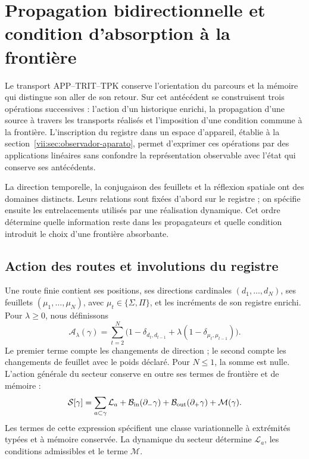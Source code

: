 
\section{Propagation bidirectionnelle et condition d'absorption à la frontière}
\label{vii:sec:propagacion-bidireccional}

Le transport APP--TRIT--TPK conserve l'orientation du parcours et la mémoire qui distingue son aller de son retour. Sur cet antécédent se construisent trois opérations successives : l'action d'un historique enrichi, la propagation d'une source à travers les transports réalisés et l'imposition d'une condition commune à la frontière. L'inscription du registre dans un espace d'appareil, établie à la section~\ref{vii:sec:observador-aparato}, permet d'exprimer ces opérations par des applications linéaires sans confondre la représentation observable avec l'état qui conserve ses antécédents.

La direction temporelle, la conjugaison des feuillets et la réflexion spatiale
ont des domaines distincts. Leurs relations sont fixées d'abord sur le registre ;
on spécifie ensuite les entrelacements utilisés par une réalisation
dynamique. Cet ordre détermine quelle information reste dans les propagateurs
et quelle condition introduit le choix d'une frontière absorbante.

\subsection{Action des routes et involutions du registre}
\label{vii:subsec:accion-bidireccional}

Une route finie contient ses positions, ses directions cardinales
\((d_1,\ldots,d_N)\), ses feuillets \((\mu_1,\ldots,\mu_N)\), avec
\(\mu_t\in\{\Sigma,\Pi\}\), et les incréments de son registre
enrichi. Pour \(\lambda\geq0\), nous définissons
\begin{equation}
 \mathcal A_\lambda(\gamma)
 =\sum_{t=2}^N
 \bigl(1-\delta_{d_t,d_{t-1}}
       +\lambda(1-\delta_{\mu_t,\mu_{t-1}})\bigr).
 \label{vii:eq:accion-ruta-bidireccional}
\end{equation}
Le premier terme compte les changements de direction ; le second compte les changements
de feuillet avec le poids déclaré. Pour \(N\leq1\), la somme est nulle.
L'action générale du secteur conserve en outre ses termes de frontière et de
mémoire :
\begin{equation}
 \mathcal S[\gamma]
 =\sum_{a\subset\gamma}\mathcal L_a
  +\mathcal B_{\rm in}(\partial_-\gamma)
  +\mathcal B_{\rm out}(\partial_+\gamma)
  +\mathcal M(\gamma).
 \label{vii:eq:accion-enriquecida-frontera}
\end{equation}
Les termes de cette expression spécifient une classe variationnelle à
extrémités typées et à mémoire conservée. La dynamique du secteur détermine
\(\mathcal L_a\), les conditions admissibles et le terme \(\mathcal M\).

